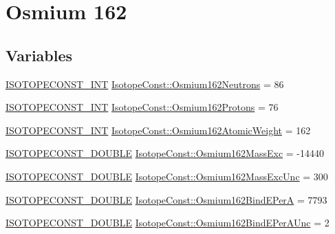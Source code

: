 \hypertarget{group___isotope_const-_osmium-_os162}{}\section{Osmium 162}
\label{group___isotope_const-_osmium-_os162}
\subsection*{Variables}
\begin{DoxyCompactItemize}
\item 
\mbox{\hyperlink{group___isotope_const-_macros_ga5f18360b3e99483a35c32d789e62621c}{I\+S\+O\+T\+O\+P\+E\+C\+O\+N\+S\+T\+\_\+\+I\+NT}} \mbox{\hyperlink{group___isotope_const-_osmium-_os162_ga75b91702415c1b24d58f71648edc9161}{Isotope\+Const\+::\+Osmium162\+Neutrons}} = 86
\item 
\mbox{\hyperlink{group___isotope_const-_macros_ga5f18360b3e99483a35c32d789e62621c}{I\+S\+O\+T\+O\+P\+E\+C\+O\+N\+S\+T\+\_\+\+I\+NT}} \mbox{\hyperlink{group___isotope_const-_osmium-_os162_gacdf8e6395f4110e63c4222e18e7950b1}{Isotope\+Const\+::\+Osmium162\+Protons}} = 76
\item 
\mbox{\hyperlink{group___isotope_const-_macros_ga5f18360b3e99483a35c32d789e62621c}{I\+S\+O\+T\+O\+P\+E\+C\+O\+N\+S\+T\+\_\+\+I\+NT}} \mbox{\hyperlink{group___isotope_const-_osmium-_os162_ga187e7065314679c920acaadea97a8a08}{Isotope\+Const\+::\+Osmium162\+Atomic\+Weight}} = 162
\item 
\mbox{\hyperlink{group___isotope_const-_macros_ga8f45a7272ce02c0b4c65c44636ed719a}{I\+S\+O\+T\+O\+P\+E\+C\+O\+N\+S\+T\+\_\+\+D\+O\+U\+B\+LE}} \mbox{\hyperlink{group___isotope_const-_osmium-_os162_gae27c1d51480ad42bce428b306a21cb81}{Isotope\+Const\+::\+Osmium162\+Mass\+Exc}} = -\/14440
\item 
\mbox{\hyperlink{group___isotope_const-_macros_ga8f45a7272ce02c0b4c65c44636ed719a}{I\+S\+O\+T\+O\+P\+E\+C\+O\+N\+S\+T\+\_\+\+D\+O\+U\+B\+LE}} \mbox{\hyperlink{group___isotope_const-_osmium-_os162_gafc3c700cf821637a7144fa3747b8f285}{Isotope\+Const\+::\+Osmium162\+Mass\+Exc\+Unc}} = 300
\item 
\mbox{\hyperlink{group___isotope_const-_macros_ga8f45a7272ce02c0b4c65c44636ed719a}{I\+S\+O\+T\+O\+P\+E\+C\+O\+N\+S\+T\+\_\+\+D\+O\+U\+B\+LE}} \mbox{\hyperlink{group___isotope_const-_osmium-_os162_gada07f9866b3b60d0db6950d16f592d52}{Isotope\+Const\+::\+Osmium162\+Bind\+E\+PerA}} = 7793
\item 
\mbox{\hyperlink{group___isotope_const-_macros_ga8f45a7272ce02c0b4c65c44636ed719a}{I\+S\+O\+T\+O\+P\+E\+C\+O\+N\+S\+T\+\_\+\+D\+O\+U\+B\+LE}} \mbox{\hyperlink{group___isotope_const-_osmium-_os162_ga4e89763ce2357223687c89bb7e5532b8}{Isotope\+Const\+::\+Osmium162\+Bind\+E\+Per\+A\+Unc}} = 2

\end{DoxyCompactItemize}
